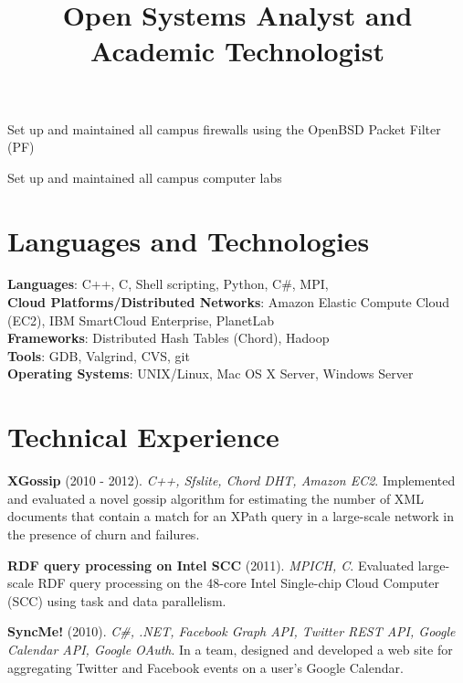\documentclass[margin,line]{resume}
\begin{document}
\begin{resume}
\newpage

    \title{\textbf{Open Systems Analyst and Academic Technologist}}
    \begin{position}
    \vspace{-2mm}
    \begin{list2}
    \item Set up and maintained all campus firewalls using the OpenBSD Packet Filter (PF)
    \item Set up and maintained all campus computer labs
    \end{list2}
    \end{position}

    \section{\mysidestyle Languages and Technologies} 

    \textbf{Languages}: C++, C, Shell scripting, Python, C\#, MPI, \LaTeXe\\
    \textbf{Cloud Platforms/Distributed Networks}: Amazon Elastic Compute Cloud (EC2), IBM SmartCloud Enterprise, PlanetLab\\
    \textbf{Frameworks}: Distributed Hash Tables (Chord), Hadoop\\
    \textbf{Tools}: GDB, Valgrind, CVS, git\\
    \textbf{Operating Systems}: {\sc UNIX}/Linux, Mac OS X Server, Windows Server
    
    \section{\mysidestyle Technical Experience}
    
    \textbf{XGossip} (2010 - 2012). \textsl{C++, Sfslite, Chord DHT, Amazon EC2}. Implemented and evaluated a novel gossip algorithm for estimating the number of XML documents that contain a match for an XPath query in a large-scale network in the presence of churn and failures.

\vspace{-2mm}
    \textbf{RDF query processing on Intel SCC} (2011). \textsl{MPICH, C}. Evaluated large-scale RDF query processing on the 48-core Intel Single-chip Cloud Computer (SCC) using task and data parallelism.
    
\vspace{-2mm}
    \textbf{SyncMe!} (2010). \textsl{C\#, .NET, Facebook Graph API, Twitter REST API, Google Calendar API, Google OAuth}. In a team, designed and developed a web site for aggregating Twitter and Facebook events on a user's Google Calendar.


\end{resume}
\end{document}
